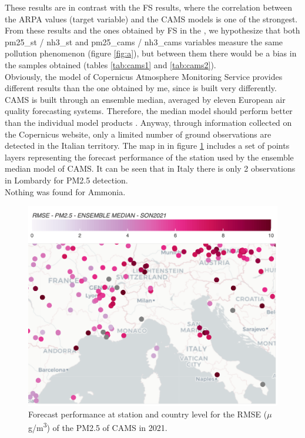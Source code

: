 These results are in contrast with the FS results, where the correlation between the ARPA values (target variable) and the CAMS models is one of the strongest.
From these results and the ones obtained by FS in the , we hypothesize that both pm25\_st / nh3\_st and pm25\_cams / nh3\_cams variables measure the same pollution phenomenon (figure \ref{fig:a}), but between them there would be a bias in the samples obtained (tables \ref{tab:cams1} and \ref{tab:cams2}).\\
Obviously, the model of Copernicus Atmosphere Monitoring Service provides different results than the one obtained by me, since is built very differently. CAMS is built through an ensemble median, averaged by eleven European air quality forecasting systems. Therefore, the median model should perform better than the individual model products \cite{riccio2007seeking}.
Anyway, through information collected on the Copernicus website, only a limited number of ground observations are detected in the Italian territory. 
The map in in figure \ref{fig:cams} includes a set of points layers representing the forecast performance of the station used by the ensemble median model of CAMS.
It can be seen that in Italy there is only 2 observations in Lombardy for PM2.5 detection.\\
Nothing was found for Ammonia.
\begin{figure}[H]
    \centering
    \includegraphics[scale=0.25]{images/cams_obs.png}
    \caption{Forecast performance at station and country level for the RMSE ($\mu$g/m\textsuperscript{3}) of the PM2.5 of CAMS \cite{camsobs} in 2021. 
}
    \label{fig:cams}
\end{figure}

